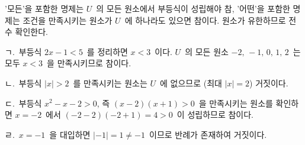 \documentclass[10pt]{article}
\begin{document}
\begin{dmapproach}
'모든'을 포함한 명제는 $U$\ 의 모든 원소에서 부등식이 성립해야 참, '어떤'을 포함한 명제는 조건을 만족시키는 원소가 $U$\ 에 하나라도 있으면 참이다. 원소가 유한하므로 전수 확인한다.
\end{dmapproach}

\begin{dmsolution}
ㄱ.\ 부등식 $2x - 1 < 5$\ 를 정리하면 $x < 3$\ 이다. $U$\ 의 모든 원소 $-2,\, -1,\, 0,\, 1,\, 2$\ 는 모두 $x < 3$\ 을 만족시키므로 참이다.

ㄴ.\ 부등식 $|x| > 2$\ 를 만족시키는 원소는 $U$\ 에 없으므로 (최대 $|x| = 2$) 거짓이다.

ㄷ.\ 부등식 $x^{2} - x - 2 > 0$, 즉 $(x - 2)(x + 1) > 0$\ 을 만족시키는 원소를 확인하면 $x = -2$\ 에서 $(-2 - 2)(-2 + 1) = 4 > 0$\ 이 성립하므로 참이다.

ㄹ.\ $x = -1$\ 을 대입하면 $|-1| = 1 \ne -1$\ 이므로 반례가 존재하여 거짓이다.
\end{dmsolution}

\dmchecktitle



\newpage

\dmconcepthead
{}
\end{document}
